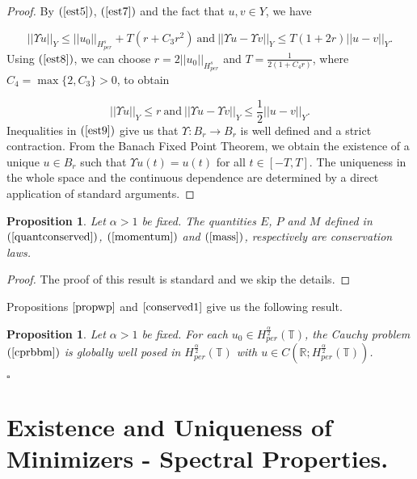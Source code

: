 \documentclass[12pt,reqno]{amsart}
\newcommand{\2}{L^2_{per}(0, T)}
\newtheorem{prop}{Proposition}[section]
\newcommand{\Hn}{{H_{per}^{\frac{\alpha}{2}}}}
\newcommand{\Hns}{{H_{per}^{s}}}
\numberwithin{equation}{section}
\numberwithin{figure}{section}
\newtheorem{proposition}[theorem]{Proposition}
\begin{document}
\begin{proof}
	\indent By $(\ref{est5})$, $(\ref{est7})$ and the fact that $u,v\in Y$, we have
	
	\begin{equation}\label{est8}
	||\Upsilon u||_{Y}\leq ||u_0||_{\Hns}+T\left(r+C_3r^2\right)\ \mbox{and}\  ||\Upsilon u-\Upsilon v||_{Y}\leq T\left(1+2r\right)||u-v||_Y.
	\end{equation}
	Using $(\ref{est8})$, we can choose $r=2||u_0||_{\Hns}$ and $T=\frac{1}{2(1+C_4r)}$, where $C_4=\max \{2,C_3\}>0$, to obtain
	
	\begin{equation}\label{est9}
	||\Upsilon u||_{Y}\leq r\ \mbox{and}\  ||\Upsilon u-\Upsilon v||_{Y}\leq \frac{1}{2}||u-v||_Y.
	\end{equation}
	Inequalities in $(\ref{est9})$ give us that $\Upsilon:B_r\rightarrow B_r$ is well defined and a strict contraction. From the Banach Fixed Point Theorem, we obtain the existence of a unique $u\in B_r$ such that $\Upsilon u(t)=u(t)$ for all $t\in [-T,T]$. The uniqueness in the whole space and the continuous dependence are determined by a direct application of standard arguments.
\end{proof}



\begin{prop}\label{conserved1}
	Let $\alpha>1$ be fixed. The quantities $E$, $P$ and $M$ defined in $(\ref{quantconserved})$, $(\ref{momentum})$ and $(\ref{mass})$, respectively  are conservation laws.
\end{prop}

\begin{proof}
The proof of this result is standard and we skip the details.

\end{proof}

\indent Propositions $\ref{propwp}$ and $\ref{conserved1}$ give us the following result.

\begin{proposition}\label{teogwp}
	Let $\alpha>1$ be fixed. For each $u_0\in \Hn(\mathbb{T})$, the Cauchy problem $(\ref{cprbbm})$ is globally well posed in $\Hn(\mathbb{T})$ with $u\in C(\mathbb{R};\Hn(\mathbb{T}))$.	
\end{proposition}
\begin{flushright}
	$\square$
\end{flushright}

\section{Existence and Uniqueness of Minimizers - Spectral Properties.}
\end{document}
